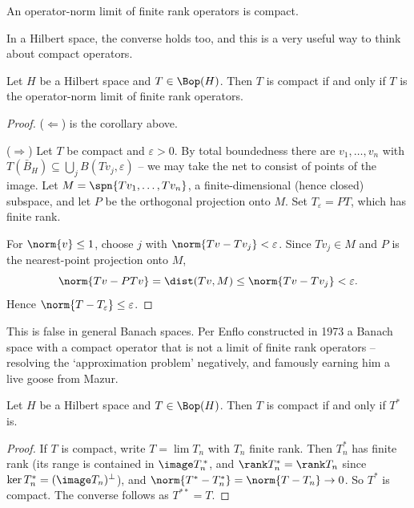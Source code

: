 \begin{corollary}
	An operator-norm limit of finite rank operators is compact.
\end{corollary}

In a Hilbert space, the converse holds too, and this is a very useful way to think about compact operators.

\begin{theorem}
	Let $H$ be a Hilbert space and $T\in\Bop(H)$. Then $T$ is compact if and only if $T$ is the operator-norm limit of finite rank operators.
\end{theorem}

\begin{proof}
	($\Leftarrow$) is the corollary above.

	($\Rightarrow$) Let $T$ be compact and $\varepsilon>0$. By total boundedness there are $v_1,\dots,v_n$ with $T(\bar B_H)\subseteq\bigcup_j B(Tv_j,\varepsilon)$ -- we may take the net to consist of points of the image. Let $M = \spn\{Tv_1,\dots,Tv_n\}$, a finite-dimensional (hence closed) subspace, and let $P$ be the orthogonal projection onto $M$. Set $T_\varepsilon = PT$, which has finite rank.

	For $\norm{v}\leq1$, choose $j$ with $\norm{Tv - Tv_j}<\varepsilon$. Since $Tv_j \in M$ and $P$ is the nearest-point projection onto $M$,
	$$\norm{Tv - PTv} = \dist(Tv, M)\leq\norm{Tv - Tv_j}<\varepsilon.$$
	Hence $\norm{T - T_\varepsilon}\leq\varepsilon$.
\end{proof}

\begin{remark}
	This is false in general Banach spaces. Per Enflo constructed in 1973 a Banach space with a compact operator that is not a limit of finite rank operators -- resolving the `approximation problem' negatively, and famously earning him a live goose from Mazur.
\end{remark}

\begin{proposition}
	Let $H$ be a Hilbert space and $T \in \Bop(H)$. Then $T$ is compact if and only if $T^*$ is.
\end{proposition}

\begin{proof}
	If $T$ is compact, write $T = \lim T_n$ with $T_n$ finite rank. Then $T_n^*$ has finite rank (its range is contained in $\image T_n^{\,*}$, and $\rank T_n^* = \rank T_n$ since $\ker T_n^* = (\image T_n)^\perp$), and $\norm{T^*-T_n^*}=\norm{T-T_n}\to0$. So $T^*$ is compact. The converse follows as $T^{**}=T$.
\end{proof}


